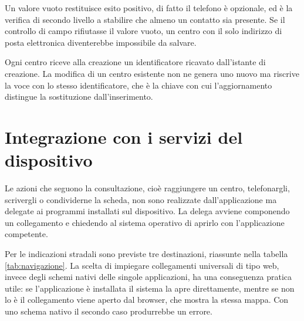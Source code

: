 Un valore vuoto restituisce esito positivo, di fatto il telefono è opzionale, ed è la verifica di secondo
livello a stabilire che almeno un contatto sia presente.
Se il controllo di campo rifiutasse il valore vuoto, un centro con il solo indirizzo di posta elettronica diventerebbe impossibile da salvare.


Ogni centro riceve alla creazione un identificatore ricavato dall'istante di creazione. %
La modifica di un centro esistente non ne genera uno nuovo ma riscrive la voce con lo stesso identificatore, che è la
chiave con cui l'aggiornamento distingue la sostituzione dall'inserimento.

\section{Integrazione con i servizi del dispositivo}\label{sec:impl-integrazione}

Le azioni che seguono la consultazione, cioè raggiungere un centro, telefonargli, scrivergli o condividerne la scheda, non sono
realizzate dall'applicazione ma delegate ai programmi installati sul dispositivo.
La delega avviene componendo un collegamento e chiedendo al sistema operativo di aprirlo con l'applicazione competente.

Per le indicazioni stradali sono previste tre destinazioni, riassunte nella tabella \ref{tab:navigazione}.
La scelta di impiegare collegamenti universali di tipo web, invece degli schemi nativi delle singole applicazioni, ha
una conseguenza pratica utile: se l'applicazione è installata il sistema la apre direttamente, mentre se non lo è il
collegamento viene aperto dal browser, che mostra la stessa mappa.
Con uno schema nativo il secondo caso produrrebbe un errore.


